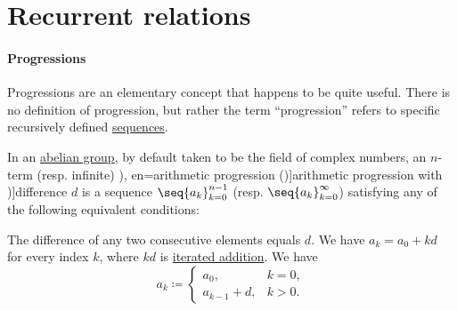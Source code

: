 \section{Recurrent relations}\label{sec:recurrent_relations}

\paragraph{Progressions}\hfill

Progressions are an elementary concept that happens to be quite useful. There is no definition of progression, but rather the term \enquote{progression} refers to specific recursively defined \hyperref[def:sequence]{sequences}.

\begin{definition}\label{def:arithmetic_progression}
  In an \hyperref[def:abelian_group]{abelian group}, by default taken to be the field of complex numbers, an \( n \)-term (resp. infinite) \term[ru=арифметическая прогрессия (\cite[143]{АлександровМаркушевичХинчин1952ЭнциклопедияТом3}), en=arithmetic progression (\cite[def. 2.4.3]{Rosen2019DiscreteMathematics})]{arithmetic progression} with \term[en=common difference (\cite[def. 2.4.3]{Rosen2019DiscreteMathematics})]{difference} \( d \) is a sequence \( \seq{ a_k }_{k=0}^{n-1} \) (resp. \( \seq{ a_k }_{k=0}^\infty \)) satisfying any of the following equivalent conditions:
  \begin{thmenum}
     The difference of any two consecutive elements equals \( d \).
     We have \( a_k = a_0 + kd \) for every index \( k \), where \( kd \) is \hyperref[con:additive_semigroup/multiplication]{iterated addition}.
     We have
    \begin{equation}\label{eq:def:arithmetic_progression/recursive}
      a_k \coloneqq \begin{cases}
        a_0,         &k = 0, \\
        a_{k-1} + d, &k > 0.
      \end{cases}
    \end{equation}
  \end{thmenum}
\end{definition}

